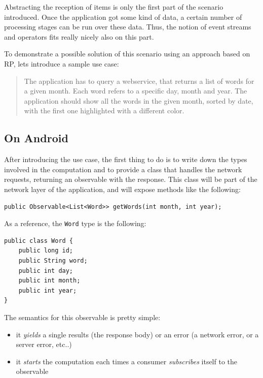 Abstracting the reception of items is only the first part of the
scenario introduced. Once the application got some kind of data, a
certain number of processing stages can be run over these data. Thus,
the notion of event streams and operators fits really nicely also on
this part.

To demonstrate a possible solution of this scenario using an approach
based on RP, lets introduce a sample use case:

\begin{quote}
The application has to query a webservice, that returns a list of words
for a given month. Each word refers to a specific day, month and year.
The application should show all the words in the given month, sorted by
date, with the first one highlighted with a different color.
\end{quote}

\subsection{On Android}\label{on-android}

After introducing the use case, the first thing to do is to write down
the types involved in the computation and to provide a class that
handles the network requests, returning an observable with the response.
This class will be part of the network layer of the application, and
will expose methods like the following:

\begin{verbatim}
public Observable<List<Word>> getWords(int month, int year);
\end{verbatim}

As a reference, the \texttt{Word} type is the following:

\begin{verbatim}
public class Word {
    public long id;
    public String word;
    public int day;
    public int month;
    public int year;
}
\end{verbatim}

The semantics for this observable is pretty simple:

\begin{itemize}
\itemsep1pt\parskip0pt
\item
  it \emph{yields} a single results (the response body) or an error (a
  network error, or a server error, etc..)
\item
  it \emph{starts} the computation each times a consumer
  \emph{subscribes} itself to the observable
\end{itemize}

